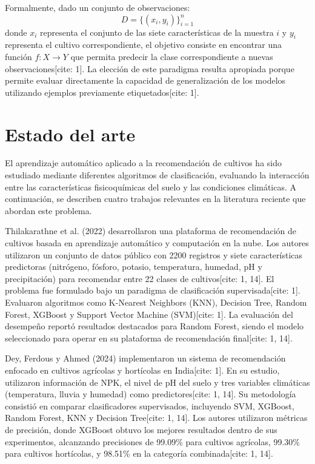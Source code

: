 \documentclass[conference]{IEEEtran}
\begin{document}
Formalmente, dado un conjunto de observaciones:
\begin{equation}
D = \{(x_i,y_i)\}_{i=1}^{n}
\end{equation}
donde $x_i$ representa el conjunto de las siete características de la muestra $i$ y $y_i$ representa el cultivo correspondiente, el objetivo consiste en encontrar una función $f:X\rightarrow Y$ que permita predecir la clase correspondiente a nuevas observaciones[cite: 1]. La elección de este paradigma resulta apropiada porque permite evaluar directamente la capacidad de generalización de los modelos utilizando ejemplos previamente etiquetados[cite: 1].



\section{Estado del arte}

El aprendizaje automático aplicado a la recomendación de cultivos ha sido estudiado mediante diferentes algoritmos de clasificación, evaluando la interacción entre las características fisicoquímicas del suelo y las condiciones climáticas. A continuación, se describen cuatro trabajos relevantes en la literatura reciente que abordan este problema.

Thilakarathne et al. (2022) desarrollaron una plataforma de recomendación de cultivos basada en aprendizaje automático y computación en la nube. Los autores utilizaron un conjunto de datos público con 2200 registros y siete características predictoras (nitrógeno, fósforo, potasio, temperatura, humedad, pH y precipitación) para recomendar entre 22 clases de cultivos[cite: 1, 14]. El problema fue formulado bajo un paradigma de clasificación supervisada[cite: 1]. Evaluaron algoritmos como K-Nearest Neighbors (KNN), Decision Tree, Random Forest, XGBoost y Support Vector Machine (SVM)[cite: 1]. La evaluación del desempeño reportó resultados destacados para Random Forest, siendo el modelo seleccionado para operar en su plataforma de recomendación final[cite: 1, 14].

Dey, Ferdous y Ahmed (2024) implementaron un sistema de recomendación enfocado en cultivos agrícolas y hortícolas en India[cite: 1]. En su estudio, utilizaron información de NPK, el nivel de pH del suelo y tres variables climáticas (temperatura, lluvia y humedad) como predictores[cite: 1, 14]. Su metodología consistió en comparar clasificadores supervisados, incluyendo SVM, XGBoost, Random Forest, KNN y Decision Tree[cite: 1, 14]. Los autores utilizaron métricas de precisión, donde XGBoost obtuvo los mejores resultados dentro de sus experimentos, alcanzando precisiones de 99.09\% para cultivos agrícolas, 99.30\% para cultivos hortícolas, y 98.51\% en la categoría combinada[cite: 1, 14].
\end{document}
